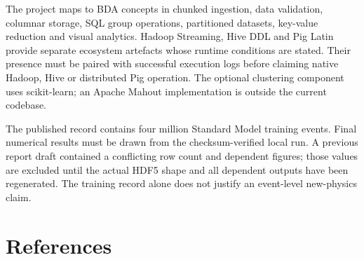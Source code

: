 \documentclass[11pt,a4paper]{article}
\begin{document}
The project maps to BDA concepts in chunked ingestion, data validation, columnar storage, SQL group operations, partitioned datasets, key-value reduction and visual analytics. Hadoop Streaming, Hive DDL and Pig Latin provide separate ecosystem artefacts whose runtime conditions are stated. Their presence must be paired with successful execution logs before claiming native Hadoop, Hive or distributed Pig operation. The optional clustering component uses scikit-learn; an Apache Mahout implementation is outside the current codebase.

The published record contains four million Standard Model training events. Final numerical results must be drawn from the checksum-verified local run. A previous report draft contained a conflicting row count and dependent figures; those values are excluded until the actual HDF5 shape and all dependent outputs have been regenerated. The training record alone does not justify an event-level new-physics claim.

\section{References}
\end{document}
